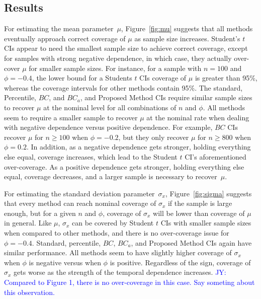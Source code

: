 \documentclass[12pt, letterpaper, titlepage]{article}
\newcommand{\jy}[1]{\textcolor{blue}{JY: #1}}
\begin{document}
\subsection{Results}

For estimating the mean parameter~$\mu$, Figure~\ref{fig:mu} suggests that all
methods eventually approach correct coverage of $\mu$ as sample size
increases. Student's $t$ CIs appear to need the smallest sample size
to achieve correct coverage, except for samples with strong negative
dependence, in which case, they actually over-cover $\mu$ for smaller sample
sizes. For instance, for a sample with $n = 100$ and $\phi = -0.4$, the lower
bound for a Students $t$ CIs coverage of $\mu$ is greater than 95\%, whereas
the coverage intervals for other methods contain 95\%. The standard,
Percentile, $BC$, and $BC_a$, and Proposed Method CIs require similar sample
sizes to recover $\mu$ at the nominal level for all combinations of $n$ and
$\phi$. All methods seem to require a smaller sample to recover $\mu$ at the
nominal rate when dealing with negative dependence versus positive dependence.
For example, $BC$ CIs recover $\mu$ for $n \geq 100$ when $\phi = -0.2$, but
they only recover $\mu$ for $n \geq 800$ when $\phi = 0.2$. In addition, as a
negative dependence gets stronger, holding everything else equal, coverage
increases, which lead to the Student $t$ CI's aforementioned over-coverage. As
a positive dependence gets stronger, holding everything else equal, coverage
decreases, and a larger sample is necessary to recover~$\mu$.


For estimating the standard deviation parameter~$\sigma_x$,
Figure~\ref{fig:sigma} suggests that every method can reach nominal coverage of
$\sigma_x$ if the sample is large enough, but for a given $n$ and $\phi$,
coverage of $\sigma_x$ will be lower than coverage of $\mu$ in general. Like
$\mu$, $\sigma_x$ can be covered by Student $t$ CIs with smaller sample sizes
when compared to other methods, and there is no over-coverage issue for
$\phi = -0.4$. Standard, percentile, $BC$, $BC_a$, and Proposed Method CIs
again have similar performance. All methods seem to have slightly higher
coverage of $\sigma_x$ when $\phi$ is negative versus when $\phi$ is positive.
Regardless of the sign, coverage of $\sigma_x$ gets worse as the strength of
the temporal dependence increases.
\jy{Compared to Figure 1, there is no over-coverage in this case. Say someting
  about this observation.}
\end{document}
